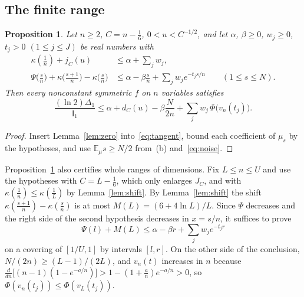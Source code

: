 \documentclass[11pt]{amsart}
\newtheorem{proposition}[theorem]{Proposition}
\theoremstyle{definition}
\theoremstyle{remark}
\newcommand{\E}{\mathbb E}
\newcommand{\I}{\mathsf I}
\begin{document}
\subsection{The finite range}
\begin{proposition}\label{prop:dual}
Let $n\ge2$, $C=n-\frac16$, $0<u<C^{-1/2}$, and let $\alpha$, $\beta\ge0$, $w_j\ge0$, $t_j>0$ $(1\le j\le J)$ be real numbers with
\begin{align*}
 \kappa(\tfrac1n)+j_C(u)&\le\alpha+\textstyle\sum_jw_j,\\
 \Psi\bigl(\tfrac sn\bigr)+\kappa\bigl(\tfrac{s+1}n\bigr)-\kappa\bigl(\tfrac sn\bigr)&\le\alpha-\beta\tfrac sn+\textstyle\sum_jw_je^{-t_js/n}\qquad(1\le s\le N).
\end{align*}
Then every nonconstant symmetric $f$ on $n$ variables satisfies
\[
 \frac{(\ln2)\Delta_1}{\I_1}\le\alpha+d_C(u)-\beta\frac{N}{2n}+\sum_jw_j\,\Phi\bigl(v_n(t_j)\bigr).
\]
\end{proposition}

\begin{proof}
Insert Lemma~\ref{lem:zero} into~\eqref{eq:tangent}, bound each coefficient of $\mu_s$ by the hypotheses, and use $\E_\mu s\ge N/2$ from~(b) and~\eqref{eq:noise}.
\end{proof}

Proposition~\ref{prop:dual} also certifies whole ranges of dimensions. Fix $L\le n\le U$ and use the hypotheses with $C=L-\frac16$, which only enlarges $J_C$, and with $\kappa(\frac1n)\le\kappa(\frac1L)$ by Lemma~\ref{lem:shift}. By Lemma~\ref{lem:shift} the shift $\kappa(\frac{s+1}n)-\kappa(\frac sn)$ is at most $M(L)=(6+4\ln L)/L$. Since $\Psi$ decreases and the right side of the second hypothesis decreases in $x=s/n$, it suffices to prove
\[
 \Psi(l)+M(L)\le\alpha-\beta r+\textstyle\sum_jw_je^{-t_jr}
\]
on a covering of $[1/U,1]$ by intervals $[l,r]$. On the other side of the conclusion, $N/(2n)\ge(L-1)/(2L)$, and $v_n(t)$ increases in $n$ because $\frac{d}{dn}\bigl[(n-1)(1-e^{-a/n})\bigr]>1-(1+\frac an)e^{-a/n}>0$, so $\Phi(v_n(t_j))\le\Phi(v_L(t_j))$.
\end{document}
